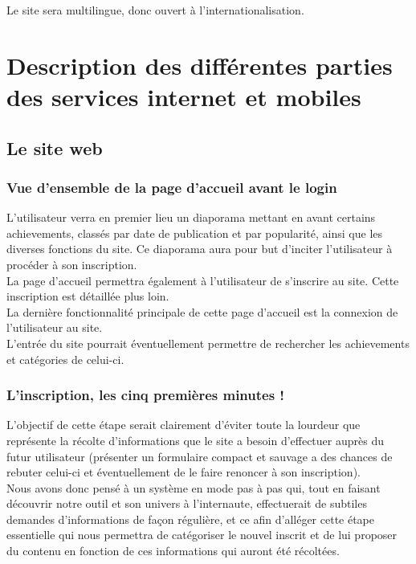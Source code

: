 \documentclass{life-fr}
\begin{document}
Le site sera multilingue, donc ouvert à l'internationalisation.


\chapter{Description des différentes parties des services internet et mobiles}

\section{Le site web}

\subsection{Vue d'ensemble de la page d'accueil avant le login}

L'utilisateur verra en premier lieu un diaporama mettant en avant certains achievements, classés par date de publication et par popularité, ainsi que les diverses fonctions du site. Ce diaporama aura pour but d'inciter l'utilisateur à procéder à son inscription.\\

La page d'accueil permettra également à l'utilisateur de s'inscrire au site. Cette inscription est détaillée plus loin.\\

La dernière fonctionnalité principale de cette page d'accueil est la connexion de l'utilisateur au site.\\

L'entrée du site pourrait éventuellement permettre de rechercher les achievements et catégories de celui-ci.

\newpage

\subsection{L'inscription, les cinq premières minutes !}

L'objectif de cette étape serait clairement d'éviter toute la lourdeur que représente la récolte d'informations que le site a besoin d'effectuer auprès du futur utilisateur (présenter un formulaire compact et sauvage a des chances de rebuter celui-ci et éventuellement de le faire renoncer à son inscription).\\

Nous avons donc pensé à un système en mode pas à pas qui, tout en faisant découvrir notre outil et son univers à l'internaute, effectuerait de subtiles demandes d'informations de façon régulière, et ce afin d'alléger cette étape essentielle qui nous permettra de catégoriser le nouvel inscrit et de lui proposer du contenu en fonction de ces informations qui auront été récoltées.\\
\end{document}
